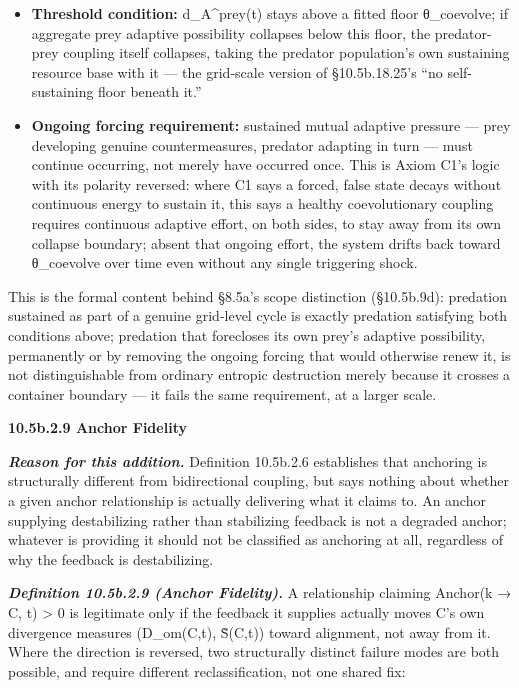\documentclass[
]{article}
\begin{document}
\begin{itemize}
\item
  \textbf{Threshold condition:} d\_A\^{}prey(t) stays above a fitted
  floor θ\_coevolve; if aggregate prey adaptive possibility collapses
  below this floor, the predator-prey coupling itself collapses, taking
  the predator population's own sustaining resource base with it --- the
  grid-scale version of §10.5b.18.25's ``no self-sustaining floor
  beneath it.''
\item
  \textbf{Ongoing forcing requirement:} sustained mutual adaptive
  pressure --- prey developing genuine countermeasures, predator
  adapting in turn --- must continue occurring, not merely have occurred
  once. This is Axiom C1's logic with its polarity reversed: where C1
  says a forced, false state decays without continuous energy to sustain
  it, this says a healthy coevolutionary coupling requires continuous
  adaptive effort, on both sides, to stay away from its own collapse
  boundary; absent that ongoing effort, the system drifts back toward
  θ\_coevolve over time even without any single triggering shock.
\end{itemize}

This is the formal content behind §8.5a's scope distinction (§10.5b.9d):
predation sustained as part of a genuine grid-level cycle is exactly
predation satisfying both conditions above; predation that forecloses
its own prey's adaptive possibility, permanently or by removing the
ongoing forcing that would otherwise renew it, is not distinguishable
from ordinary entropic destruction merely because it crosses a container
boundary --- it fails the same requirement, at a larger scale.

\textbf{10.5b.2.9 Anchor Fidelity}

\emph{\textbf{Reason for this addition.}} Definition 10.5b.2.6
establishes that anchoring is structurally different from bidirectional
coupling, but says nothing about whether a given anchor relationship is
actually delivering what it claims to. An anchor supplying destabilizing
rather than stabilizing feedback is not a degraded anchor; whatever is
providing it should not be classified as anchoring at all, regardless of
why the feedback is destabilizing.

\emph{\textbf{Definition 10.5b.2.9 (Anchor Fidelity).}} A relationship
claiming Anchor(k → C, t) \textgreater{} 0 is legitimate only if the
feedback it supplies actually moves C's own divergence measures
(D\_om(C,t), S̃(C,t)) toward alignment, not away from it. Where the
direction is reversed, two structurally distinct failure modes are both
possible, and require different reclassification, not one shared fix:
\end{document}
